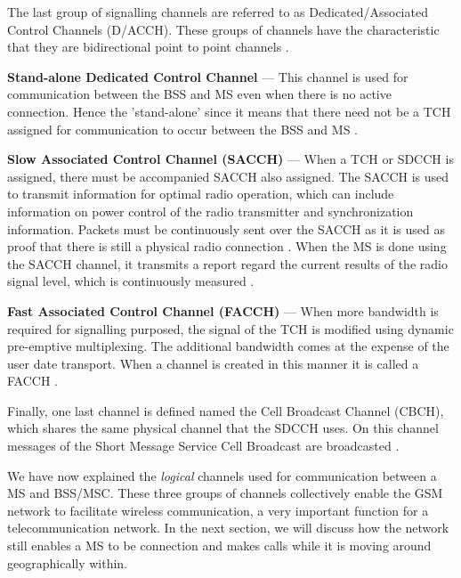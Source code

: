 The last group of signalling channels are referred to as Dedicated/Associated Control Channels (D/ACCH). These groups of channels have the characteristic that they are bidirectional point to point channels \cite{GSMArchitectureProtocolsServices}.
\begin{description}
\item{\textbf{Stand-alone Dedicated Control Channel}} --- This channel is used for communication between the BSS and MS even when there is no active connection. Hence the 'stand-alone' since it means that there need not be a TCH assigned for communication to occur between the BSS and MS \cite{GSMArchitectureProtocolsServices}.
\item{\textbf{Slow Associated Control Channel (SACCH)}} --- When a TCH or SDCCH is assigned, there must be accompanied SACCH also assigned. The SACCH is used to transmit information for optimal radio operation, which can include information on power control of the radio transmitter and synchronization information. Packets must be continuously sent over the SACCH as it is used as proof that there is still a physical radio connection \cite{GSMArchitectureProtocolsServices}. When the MS is done using the SACCH channel, it transmits a report regard the current results of the radio signal level, which is continuously measured \cite{GSMArchitectureProtocolsServices}.
\item{\textbf{Fast Associated Control Channel (FACCH)}} --- When more bandwidth is required for signalling purposed, the signal of the TCH is modified using dynamic pre-emptive multiplexing. The additional bandwidth comes at the expense of the user date transport. When a channel is created in this manner it is called a FACCH \cite{GSMArchitectureProtocolsServices}.
\end{description}

Finally, one last channel is defined named the Cell Broadcast Channel (CBCH), which shares the same physical channel that the SDCCH uses. On this channel messages of the Short Message Service Cell Broadcast are broadcasted \cite{GSMArchitectureProtocolsServices}.

We have now explained the \emph{logical} channels used for communication between a MS and BSS/MSC. These three groups of channels collectively enable the GSM network to facilitate wireless communication, a very important function for a telecommunication network. In the next section, we will discuss how the network still enables a MS to be connection and makes calls while it is moving around geographically within.
